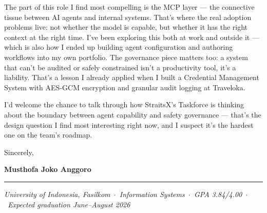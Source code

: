 \documentclass[11pt,a4paper]{article}
\begin{document}
The part of this role I find most compelling is the MCP layer --- the connective tissue
between AI agents and internal systems. That's where the real adoption problems live: not
whether the model is capable, but whether it has the right context at the right time.
I've been exploring this both at work and outside it --- which is also how I ended up
building agent configuration and authoring workflows into my own portfolio. The
governance piece matters too: a system that can't be audited or safely constrained isn't
a productivity tool, it's a liability. That's a lesson I already applied when I built a
Credential Management System with AES-GCM encryption and granular audit logging at
Traveloka.

I'd welcome the chance to talk through how StraitsX's Taskforce is thinking about the
boundary between agent capability and safety governance --- that's the design question I
find most interesting right now, and I suspect it's the hardest one on the team's
roadmap.

\vspace{10pt}
Sincerely,

\vspace{18pt}
\textbf{Musthofa Joko Anggoro}

\vspace{10pt}
\hrule
\vspace{6pt}
\footnotesize
\textit{University of Indonesia, Fasilkom\ $\cdot$\ Information Systems\ $\cdot$\ GPA 3.84/4.00\ $\cdot$\ Expected graduation June--August 2026}
\end{document}
